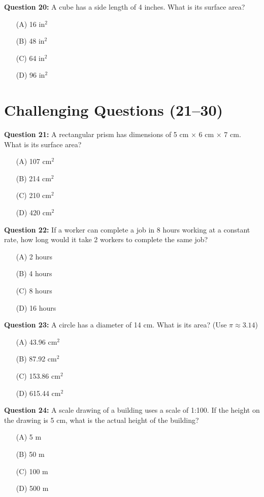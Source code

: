 \documentclass[12pt, letterpaper]{article}
\begin{document}
\noindent
\textbf{Question 20:} A cube has a side length of 4 inches. What is its surface area?
\begin{itemize}
    \item[(A)] 16 in$^2$
    \item[(B)] 48 in$^2$
    \item[(C)] 64 in$^2$
    \item[(D)] 96 in$^2$
\end{itemize}

\vspace{0.5cm}

\section*{Challenging Questions (21--30)}

\noindent
\textbf{Question 21:} A rectangular prism has dimensions of 5 cm × 6 cm × 7 cm. What is its surface area?
\begin{itemize}
    \item[(A)] 107 cm$^2$
    \item[(B)] 214 cm$^2$
    \item[(C)] 210 cm$^2$
    \item[(D)] 420 cm$^2$
\end{itemize}

\noindent
\textbf{Question 22:} If a worker can complete a job in 8 hours working at a constant rate, how long would it take 2 workers to complete the same job?
\begin{itemize}
    \item[(A)] 2 hours
    \item[(B)] 4 hours
    \item[(C)] 8 hours
    \item[(D)] 16 hours
\end{itemize}

\noindent
\textbf{Question 23:} A circle has a diameter of 14 cm. What is its area? (Use $\pi \approx 3.14$)
\begin{itemize}
    \item[(A)] 43.96 cm$^2$
    \item[(B)] 87.92 cm$^2$
    \item[(C)] 153.86 cm$^2$
    \item[(D)] 615.44 cm$^2$
\end{itemize}

\noindent
\textbf{Question 24:} A scale drawing of a building uses a scale of 1:100. If the height on the drawing is 5 cm, what is the actual height of the building?
\begin{itemize}
    \item[(A)] 5 m
    \item[(B)] 50 m
    \item[(C)] 100 m
    \item[(D)] 500 m
\end{itemize}
\end{document}
